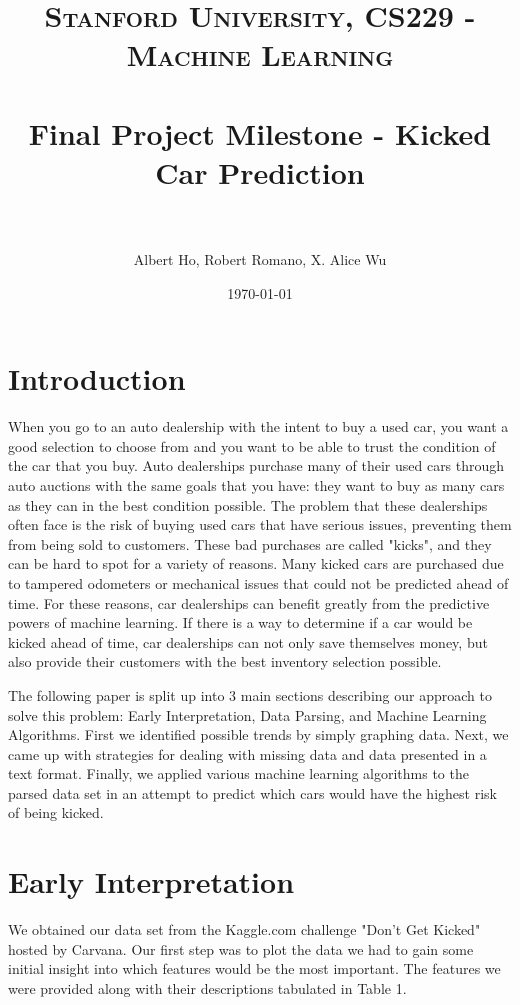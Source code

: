 \documentclass[paper=letter, fontsize=11pt]{scrartcl} %
\title{	
\normalfont \normalsize 
\textsc{Stanford University, CS229 - Machine Learning} \\ [25pt] %
\horrule{0.5pt} \\[0.4cm] %
\huge Final Project Milestone - Kicked Car Prediction \\ %
\horrule{2pt} \\[0.3cm] %
}
\author{Albert Ho, Robert Romano, X. Alice Wu} %
\date{\normalsize\today} %
\numberwithin{equation}{section} %
\begin{document}
\noindent
\maketitle %

\section{Introduction}
	When you go to an auto dealership with the intent to buy a used car, you want a good selection to choose from and you want to be able to trust the condition of the car that you buy. Auto dealerships purchase many of their used cars through auto auctions with the same goals that you have: they want to buy as many cars as they can in the best condition possible. The problem that these dealerships often face is the risk of buying used cars that have serious issues, preventing them from being sold to customers. These bad purchases are called "kicks", and they can be hard to spot for a variety of reasons. Many kicked cars are purchased due to tampered odometers or mechanical issues that could not be predicted ahead of time. For these reasons, car dealerships can benefit greatly from the predictive powers of machine learning. If there is a way to determine if a car would be kicked ahead of time, car dealerships can not only save themselves money, but also provide their customers with the best inventory selection possible.

	The following paper is split up into 3 main sections describing our approach to solve this problem: Early Interpretation, Data Parsing, and Machine Learning Algorithms. First we identified possible trends by simply graphing data. Next, we came up with strategies for dealing with missing data and data presented in a text format. Finally, we applied various machine learning algorithms to the parsed data set in an attempt to predict which cars would have the highest risk of being kicked.

\section{Early Interpretation}
	We obtained our data set from the Kaggle.com challenge "Don't Get Kicked" hosted by Carvana. Our first step was to plot the data we had to gain some initial insight into which features would be the most important. The features we were provided along with their descriptions tabulated in Table 1. 
\end{document}
